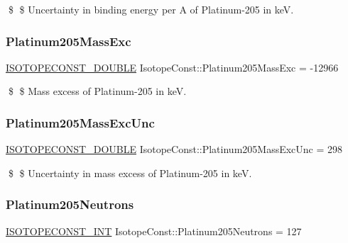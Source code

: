 \$ \$ Uncertainty in binding energy per A of Platinum-\/205 in keV. \mbox{\label{group___isotope_const-_platinum-_pt205_ga134219e549712503743a5d71d5b8dda9}} 
\subsubsection{\texorpdfstring{Platinum205\+Mass\+Exc}{Platinum205MassExc}}
{\footnotesize\ttfamily \mbox{\hyperlink{group___isotope_const-_macros_ga8f45a7272ce02c0b4c65c44636ed719a}{I\+S\+O\+T\+O\+P\+E\+C\+O\+N\+S\+T\+\_\+\+D\+O\+U\+B\+LE}} Isotope\+Const\+::\+Platinum205\+Mass\+Exc = -\/12966}

\$ \$ Mass excess of Platinum-\/205 in keV. \mbox{\label{group___isotope_const-_platinum-_pt205_gaed78d4c2d619ff5ad45b26b3d846ade8}} 
\subsubsection{\texorpdfstring{Platinum205\+Mass\+Exc\+Unc}{Platinum205MassExcUnc}}
{\footnotesize\ttfamily \mbox{\hyperlink{group___isotope_const-_macros_ga8f45a7272ce02c0b4c65c44636ed719a}{I\+S\+O\+T\+O\+P\+E\+C\+O\+N\+S\+T\+\_\+\+D\+O\+U\+B\+LE}} Isotope\+Const\+::\+Platinum205\+Mass\+Exc\+Unc = 298}

\$ \$ Uncertainty in mass excess of Platinum-\/205 in keV. \mbox{\label{group___isotope_const-_platinum-_pt205_ga61bd201fa4530dfc5cb02b9d0871127c}} 
\subsubsection{\texorpdfstring{Platinum205\+Neutrons}{Platinum205Neutrons}}
{\footnotesize\ttfamily \mbox{\hyperlink{group___isotope_const-_macros_ga5f18360b3e99483a35c32d789e62621c}{I\+S\+O\+T\+O\+P\+E\+C\+O\+N\+S\+T\+\_\+\+I\+NT}} Isotope\+Const\+::\+Platinum205\+Neutrons = 127}

